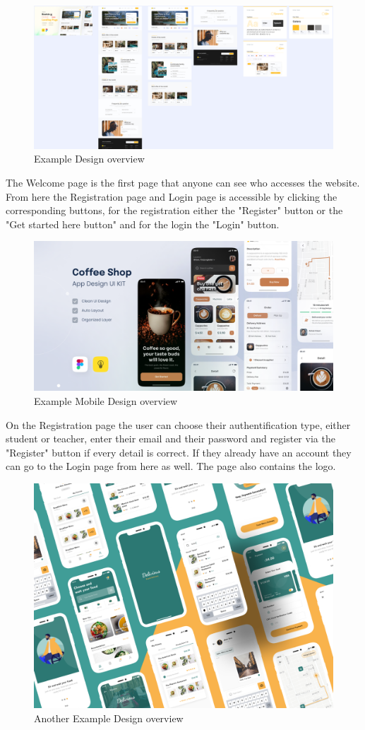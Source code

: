 \documentclass[12pt,a4paper]{article}
\begin{document}
\begin{spacing}{1.5}
    \begin{figure}[H]
        \centering
        \includegraphics[width=1\linewidth]{assets/design-overview-example.png}
        \caption{Example Design overview}
    \end{figure}
    \FloatBarrier

    \newpage
    The Welcome page is the first page that anyone can see who accesses the website. From here the Registration page and Login page is accessible by clicking the corresponding buttons, for the registration either the "Register" button or the "Get started here button" and for the login the "Login" button.

    \begin{figure}[H]
        \centering
        \includegraphics[width=0.5\linewidth]{assets/mobile-design-example.png}
        \caption{Example Mobile Design overview}
    \end{figure}
    \FloatBarrier

    On the Registration page the user can choose their authentification type,
    either student or teacher, enter their email and their password and register
    via the "Register" button if every detail is correct. If they already have an
    account they can go to the Login page from here as well. The page also contains
    the logo.

    \begin{figure}[H]
        \centering
        \includegraphics[width=0.5\linewidth]{assets/another-design-example.png}
        \caption{Another Example Design overview}
    \end{figure}
    \FloatBarrier


\end{spacing}
\end{document}
